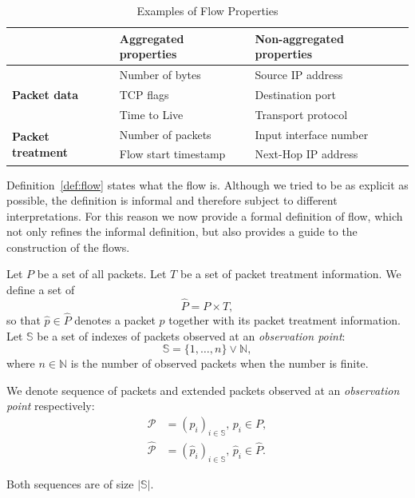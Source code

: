 \begin{table}[ht!]
    \centering
    \begin{tabular}{lll}
    \toprule
                                               & \textbf{Aggregated properties}  & \textbf{Non-aggregated properties}  \\ \midrule
    \multirow{3}{*}{\textbf{Packet data}}      & Number of bytes                 & Source IP address                   \\ 
                                               & TCP flags                       & Destination port                    \\ 
                                               & Time to Live                    & Transport protocol                  \\ \midrule
    \multirow{2}{*}{\textbf{Packet treatment}} & Number of packets               & Input interface number              \\ 
                                               & Flow start timestamp            & Next-Hop IP address                 \\ \bottomrule
    \end{tabular}
    \caption{Examples of Flow Properties}
    \label{tab:flow.properties}
\end{table}

Definition~\ref{def:flow} states what the flow is. Although we tried to be as explicit as possible, the definition is informal and therefore subject to different interpretations. For this reason we now provide a formal definition of flow, which not only refines the informal definition, but also provides a guide to the construction of the flows.

\begin{defn}
Let $P$ be a set of all packets. Let $T$ be a set of packet treatment information. We define a set of 
\begin{equation*}
    \widehat{P} = P\times T,
\end{equation*}
so that $\widehat{p} \in \widehat{P}$ denotes a packet $p$ together with its packet treatment information. Let $\mathbb{S}$ be a set of indexes of packets observed at an \emph{observation point}:
\begin{equation*}
    \mathbb{S} = \{1, \ldots, n\} \lor \mathbb{N},
\end{equation*}
where $n \in \mathbb{N}$ is the number of observed packets when the number is finite.

We denote sequence of packets and extended packets observed at an \emph{observation point} respectively:
\begin{align*}
    \mathcal{P} &= (p_i)_{i \in \mathbb{S}},\, p_i \in P,\\
    \widehat{\mathcal{P}} &= (\widehat{p}_i)_{i \in \mathbb{S}},\, \widehat{p}_i \in \widehat{P}.
\end{align*}
\end{defn}
Both sequences are of size $|\mathbb{S}|$. 

